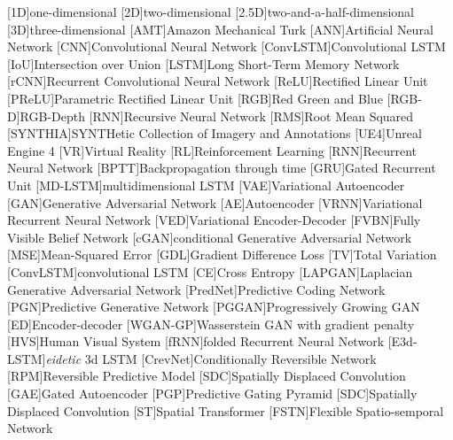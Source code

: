 \begin{acronym}
	[1D]{one-dimensional}
	[2D]{two-dimensional}
	[2.5D]{two-and-a-half-dimensional}
	[3D]{three-dimensional}
	[AMT]{Amazon Mechanical Turk}
	[ANN]{Artificial Neural Network}
	[CNN]{Convolutional Neural Network}
    [ConvLSTM]{Convolutional LSTM}
    [IoU]{Intersection over Union}
    [LSTM]{Long Short-Term Memory Network}
    [rCNN]{Recurrent Convolutional Neural Network}
	[ReLU]{Rectified Linear Unit}
    [PReLU]{Parametric Rectified Linear Unit}
	[RGB]{Red Green and Blue}
    [RGB-D]{RGB-Depth}
	[RNN]{Recursive Neural Network}
    [RMS]{Root Mean Squared}
    [SYNTHIA]{SYNTHetic Collection of Imagery and Annotations}
    [UE4]{Unreal Engine 4}
    [VR]{Virtual Reality}
    [RL]{Reinforcement Learning}
    [RNN]{Recurrent Neural Network}
    [BPTT]{Backpropagation through time}
    [GRU]{Gated Recurrent Unit}
    [MD-LSTM]{multidimensional LSTM}
    [VAE]{Variational Autoencoder}
    [GAN]{Generative Adversarial Network}
    [AE]{Autoencoder}
    [VRNN]{Variational Recurrent Neural Network}
    [VED]{Variational Encoder-Decoder}
    [FVBN]{Fully Visible Belief Network}
    [cGAN]{conditional Generative Adversarial Network}
    [MSE]{Mean-Squared Error}
    [GDL]{Gradient Difference Loss}
    [TV]{Total Variation}
    [ConvLSTM]{convolutional LSTM}
    [CE]{Cross Entropy}
    [LAPGAN]{Laplacian Generative Adversarial Network}
    [PredNet]{Predictive Coding Network}
    [PGN]{Predictive Generative Network}
    [PGGAN]{Progressively Growing GAN}
    [ED]{Encoder-decoder}
    [WGAN-GP]{Wasserstein GAN with gradient penalty}
    [HVS]{Human Visual System}
    [fRNN]{folded Recurrent Neural Network}
    [E3d-LSTM]{\textit{eidetic} 3d LSTM}
    [CrevNet]{Conditionally Reversible Network}
    [RPM]{Reversible Predictive Model}
    [SDC]{Spatially Displaced Convolution}
    [GAE]{Gated Autoencoder}
    [PGP]{Predictive Gating Pyramid}
    [SDC]{Spatially Displaced Convolution}
    [ST]{Spatial Transformer}
    [FSTN]{Flexible Spatio-semporal Network}

\end{acronym}

